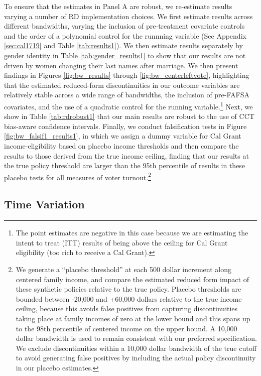 \documentclass[12pt,letterpaper,oneside]{book}
\begin{document}
To ensure that the estimates in Panel A are robust, we re-estimate results varying a number of RD implementation choices. We first estimate results across different bandwidths, varying the inclusion of pre-treatment covariate controls and the order of a polynomial control for the runnning variable (See Appendix \ref{sec:cal1719} and Table \ref{tab:results1}). We then estimate results separately by gender identity in Table \ref {tab:gender_results1} to show that our results are not driven by women changing their last names after marriage. We then present findings in Figures \ref{fig:bw_results} through \ref{fig:bw_centerleftvote}, highlighting that the estimated reduced-form discontinuities in our outcome variables are relatively stable across a wide range of bandwidths, the inclusion of pre-FAFSA covariates, and the use of a quadratic control for the running variable.\footnote{The point estimates are negative in this case because we are estimating the intent to treat (ITT) results of being above the ceiling for Cal Grant eligibility (too rich to receive a Cal Grant).} Next, we show in Table \ref{tab:rdrobust1} that our main results are robust to the use of CCT bias-aware confidence intervals. Finally, we conduct falsification tests in Figure \ref{fig:bw_falsif1_results1}, in which we assign a dummy variable for Cal Grant income-eligibility based on placebo income thresholds and then compare the results to those derived from the true income ceiling, finding that our results at the true policy threshold are larger than the 95th percentile of results in these placebo tests for all measures of voter turnout.\footnote{We generate a ``placebo threshold'' at each 500 dollar increment along centered family income, and compare the estimated reduced form impact of these synthetic policies relative to the true policy. Placebo thresholds are bounded between -20,000 and +60,000 dollars relative to the true income ceiling, because this avoids false positives from capturing discontinuities taking place at family incomes of zero at the lower bound and this spans up to the 98th percentile of centered income on the upper bound. A 10,000 dollar bandwidth is used to remain consistent with our preferred specification. We exclude discontinuities within a 10,000 dollar bandwidth of the true cutoff to avoid generating false positives by including the actual policy discontinuity in our placebo estimates.}

\subsection{Time Variation} \label{sec:time}
\end{document}
